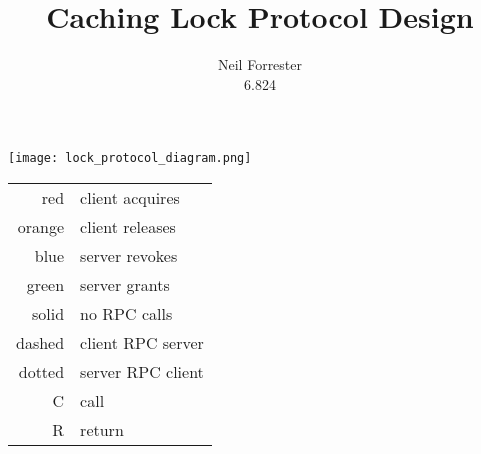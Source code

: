 \documentclass{article}
\title{Caching Lock Protocol Design}
\author{Neil Forrester\\6.824}
\begin{document}
\texttt{[image: lock\_protocol\_diagram.png]}

\begin{tabular}{r | l}
red & client acquires \\
orange & client releases \\
\hline
blue & server revokes \\
green & server grants \\
\hline
solid & no RPC calls \\
dashed & client RPC server \\
dotted & server RPC client \\
\hline
C & call \\
R & return \\
\end{tabular}
\end{document}
